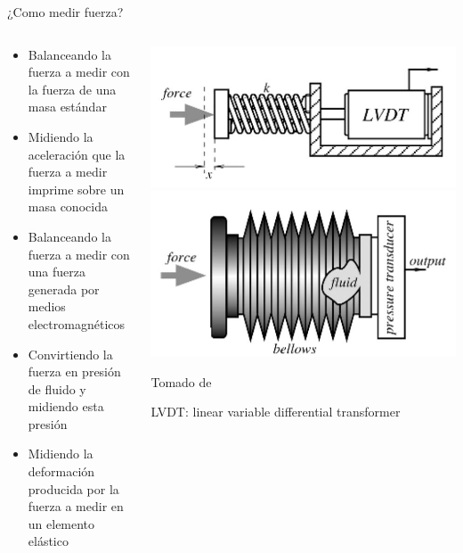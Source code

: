 \documentclass[aspectratio=169]{beamer}
\begin{document}
\begin{frame}{¿Como medir fuerza?}
    \begin{columns}[c, onlytextwidth]
        \begin{column}{0.55\textwidth}
            \begin{itemize}
                \item Balanceando la fuerza a medir con la fuerza de una masa estándar
                \item Midiendo la aceleración que la fuerza a medir imprime sobre un masa conocida
                \item Balanceando la fuerza a medir con una fuerza generada por medios electromagnéticos
                \item Convirtiendo la fuerza en presión de fluido y midiendo esta presión
                \item Midiendo la deformación producida por la fuerza a medir en un elemento elástico
            \end{itemize}
        \end{column}
        \begin{column}{0.45\textwidth}
            \centering
            \includegraphics[width = 0.8\linewidth]{fig/Fuerza_Vibracion/fuerza1.JPG}
            \includegraphics[width = 0.8\linewidth]{fig/Fuerza_Vibracion/fuerza2.JPG}
            \vspace{0.5cm}
            
            \tiny{Tomado de \cite{Fraden_2016}}
            
            \tiny{LVDT: linear variable differential transformer}
        \end{column}
    \end{columns}
\end{frame}
\end{document}
